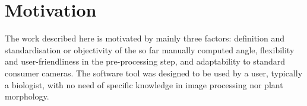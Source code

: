 \section{Motivation}
The work described here is motivated by mainly three factors: definition and standardisation  or objectivity of the so far manually computed angle, flexibility and user-friendliness in the pre-processing step, and adaptability to standard consumer cameras. The software tool was designed to be used by a user, typically a biologist, with no need of specific knowledge in image processing nor plant morphology.


%


%
%
%

